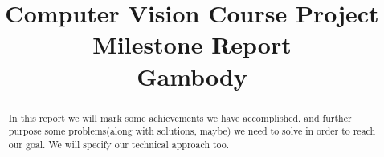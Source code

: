 \documentclass[conference,compsoc]{IEEEtran}
\begin{document}
\title{
	Computer Vision Course Project Milestone Report\\
	Gambody \\
}


\author{
}

\maketitle

\begin{abstract}
	In this report we will mark some achievements we have accomplished, and further purpose some problems(along with solutions, maybe) we need to solve in order to reach our goal.
	We will specify our technical approach too.
\end{abstract}
\end{document}
